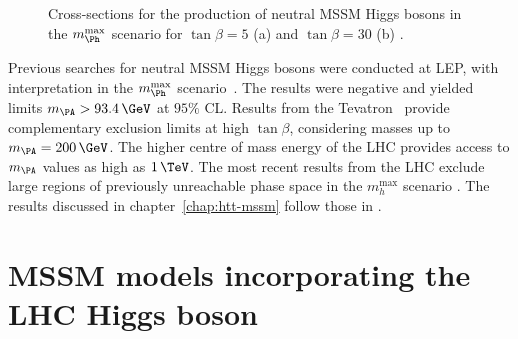\begin{figure}[htbp]
\caption[Cross-sections for the production of neutral MSSM Higgs bosons in the 
$m_{\Ph}^{\text{max}}$ scenario.]{Cross-sections for the production of neutral MSSM Higgs bosons in the 
$m_{\Ph}^{\text{max}}$ scenario for $\tan\beta=5$ (a) and $\tan\beta=30$
(b) \cite{Heinemeyer:2013tqa}.}
\label{fig:mhmaxXSs}
\end{figure}

Previous searches for neutral \ac{MSSM} Higgs bosons were conducted at LEP, with
interpretation in the $m_{\Ph}^{\text{max}}$ scenario~\cite{Schael:2006cr}.
The results were negative and yielded limits $m_{\PA} > 93.4\,\GeV$ at $95\%$ CL.  
Results from the Tevatron~\cite{Benjamin:2010xb} provide complementary exclusion 
limits at high $\tan\beta$, considering masses up to $m_{\PA}=200\,\GeV$. The
higher centre of mass energy of the LHC provides access to $m_{\PA}$ values as
high as $1\,\TeV$. The most recent results from the LHC exclude large regions of
previously unreachable phase space in the $m_{h}^{\text{max}}$ scenario
\cite{Aad:2014vgg,HIG-13-021}. The results discussed in
chapter~\ref{chap:htt-mssm} follow those in \cite{HIG-13-021}.

\section{MSSM models incorporating the LHC Higgs boson}
\label{sec:mssmbenchmarks}

